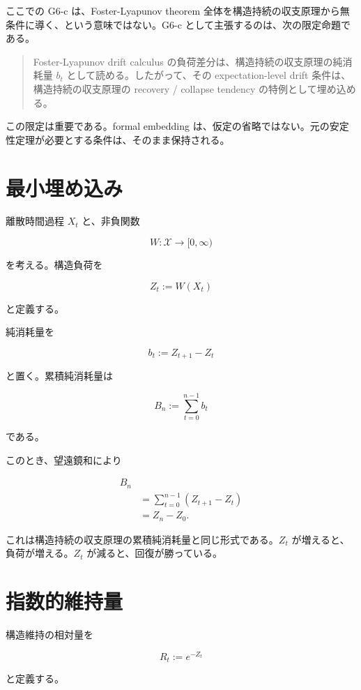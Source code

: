 \documentclass[12pt,a4paper]{article}
\begin{document}
ここでの G6-c は、Foster-Lyapunov theorem 全体を構造持続の収支原理から無条件に導く、という意味ではない。G6-c として主張するのは、次の限定命題である。

\begin{quote}
Foster-Lyapunov drift calculus の負荷差分は、構造持続の収支原理の純消耗量 $b_{t}$ として読める。したがって、その expectation-level drift 条件は、構造持続の収支原理の recovery / collapse tendency の特例として埋め込める。
\end{quote}

この限定は重要である。formal embedding は、仮定の省略ではない。元の安定性定理が必要とする条件は、そのまま保持される。

\section{最小埋め込み}\label{ux6700ux5c0fux57cbux3081ux8fbcux307f}

離散時間過程 \(X_{t}\) と、非負関数

\[
W:\mathcal X\to [0,\infty)
\]

を考える。構造負荷を

\[
Z_{t} := W(X_{t})
\]

と定義する。

純消耗量を

\[
b_{t} := Z_{t+1}-Z_{t}
\]

と置く。累積純消耗量は

\[
B_{n} := \sum_{t=0}^{n-1} b_{t}
\]

である。

このとき、望遠鏡和により

\[
\begin{aligned}
B_{n} \\
&= \sum_{t=0}^{n-1}(Z_{t+1}-Z_{t}) \\
&= Z_{n}-Z_0.
\end{aligned}
\]

これは構造持続の収支原理の累積純消耗量と同じ形式である。\(Z_{t}\) が増えると、負荷が増える。\(Z_{t}\) が減ると、回復が勝っている。

\section{指数的維持量}\label{ux6307ux6570ux7684ux7dadux6301ux91cf}

構造維持の相対量を

\[
R_{t} := e^{-Z_{t}}
\]

と定義する。
\end{document}
